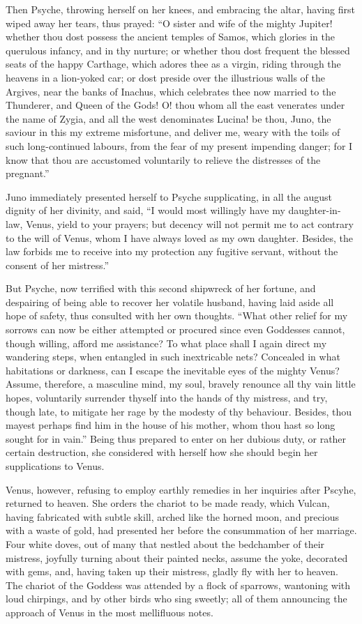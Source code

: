 \documentclass[12pt]{article}
\begin{document}
Then Psyche, throwing herself on her knees, and embracing the altar, having
first wiped away her tears, thus prayed: ``O sister and wife of the mighty
Jupiter! whether thou dost possess the ancient temples of Samos, which glories
in the querulous infancy, and in thy nurture; or whether thou dost frequent the
blessed seats of the happy Carthage, which adores thee as a virgin, riding
through the heavens in a lion-yoked car; or dost preside over the illustrious
walls of the Argives, near the banks of Inachus, which celebrates thee now
married to the Thunderer, and Queen of the Gods! O! thou whom all the east
venerates under the name of Zygia, and all the west denominates Lucina! be
thou, Juno, the saviour in this my extreme misfortune, and deliver me, weary
with the toils of such long-continued labours, from the fear of my present
impending danger; for I know that thou are accustomed voluntarily to relieve
the distresses of the pregnant.''

Juno immediately presented herself to Psyche supplicating, in all the august
dignity of her divinity, and said, ``I would most willingly have my
daughter-in-law, Venus, yield to your prayers; but decency will not permit me
to act contrary to the will of Venus, whom I have always loved as my own
daughter. Besides, the law forbids me to receive into my protection any
fugitive servant, without the consent of her mistress.''

But Psyche, now terrified with this second shipwreck of her fortune, and
despairing of being able to recover her volatile husband, having laid aside all
hope of safety, thus consulted with her own thoughts. ``What other relief for
my sorrows can now be either attempted or procured since even Goddesses cannot,
though willing, afford me assistance? To what place shall I again direct my
wandering steps, when entangled in such inextricable nets? Concealed in what
habitations or darkness, can I escape the inevitable eyes of the mighty Venus?
Assume, therefore, a masculine mind, my soul, bravely renounce all thy vain
little hopes, voluntarily surrender thyself into the hands of thy mistress, and
try, though late, to mitigate her rage by the modesty of thy behaviour.
Besides, thou mayest perhaps find him in the house of his mother, whom thou
hast so long sought for in vain.'' Being thus prepared to enter on her dubious
duty, or rather certain destruction, she considered with herself how she should
begin her supplications to Venus.

Venus, however, refusing to employ earthly remedies in her inquiries after
Pscyhe, returned to heaven. She orders the chariot to be made ready, which
Vulcan, having fabricated with subtle skill, arched like the horned moon, and
precious with a waste of gold, had presented her before the consummation of her
marriage. Four white doves, out of many that nestled about the bedchamber of
their mistress, joyfully turning about their painted necks, assume the yoke,
decorated with gems, and, having taken up their mistress, gladly fly with her
to heaven. The chariot of the Goddess was attended by a flock of sparrows,
wantoning with loud chirpings, and by other birds who sing sweetly; all of them
announcing the approach of Venus in the most mellifluous notes.
\end{document}
